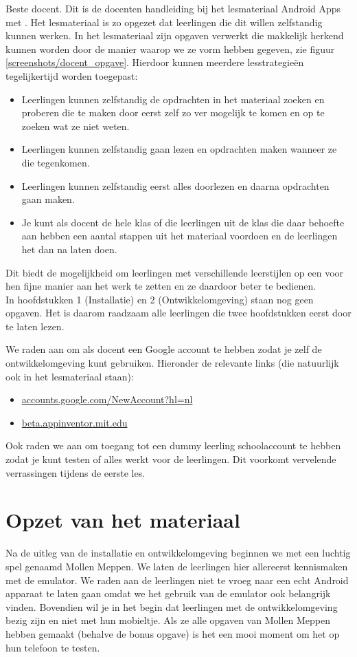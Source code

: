 \documentclass{BYUTextbook}
\begin{document}
Beste docent. Dit is de docenten handleiding bij het lesmateriaal Android Apps met \ai. Het lesmateriaal is zo opgezet dat leerlingen die dit willen zelfstandig kunnen werken. In het lesmateriaal zijn opgaven verwerkt die makkelijk herkend kunnen worden door de manier waarop we ze vorm hebben gegeven, zie figuur \ref{screenshots/docent_opgave}. Hierdoor kunnen meerdere lesstrategie\"en tegelijkertijd worden toegepast:

\begin{itemize}
  \item Leerlingen kunnen zelfstandig de opdrachten in het materiaal zoeken en proberen die te maken door eerst zelf zo ver mogelijk te komen en op te zoeken wat ze niet weten.
  \item Leerlingen kunnen zelfstandig gaan lezen en opdrachten maken wanneer ze die tegenkomen.
  \item Leerlingen kunnen zelfstandig eerst alles doorlezen en daarna opdrachten gaan maken.
  \item Je kunt als docent de hele klas of die leerlingen uit de klas die daar behoefte aan hebben een aantal stappen uit het materiaal voordoen en de leerlingen het dan na laten doen.
\end{itemize}

Dit biedt de mogelijkheid om leerlingen met verschillende leerstijlen op een voor hen fijne manier aan het werk te zetten en ze daardoor beter te bedienen. \\
In hoofdstukken 1 (Installatie) en 2 (Ontwikkelomgeving) staan nog geen opgaven. Het is daarom raadzaam alle leerlingen die twee hoofdstukken eerst door te laten lezen.


We raden aan om als docent een Google account te hebben zodat je zelf de \ai ontwikkelomgeving kunt gebruiken. Hieronder de relevante links (die natuurlijk ook in het lesmateriaal staan):
\begin{itemize}
  \item \url{accounts.google.com/NewAccount?hl=nl}
  \item \url{beta.appinventor.mit.edu}
\end{itemize}
Ook raden we aan om toegang tot een dummy leerling schoolaccount te hebben zodat je kunt testen of alles werkt voor de leerlingen. Dit voorkomt vervelende verrassingen tijdens de eerste les.

\chapter{Opzet van het materiaal}
Na de uitleg van de installatie en ontwikkelomgeving beginnen we met een luchtig spel genaamd Mollen Meppen. We laten de leerlingen hier allereerst kennismaken met de emulator. We raden aan de leerlingen niet te vroeg naar een echt Android apparaat te laten gaan omdat we het gebruik van de emulator ook belangrijk vinden. Bovendien wil je in het begin dat leerlingen met de ontwikkelomgeving bezig zijn en niet met hun mobieltje. Als ze alle opgaven van Mollen Meppen hebben gemaakt (behalve de bonus opgave) is het een mooi moment om het op hun telefoon te testen.
\end{document}
